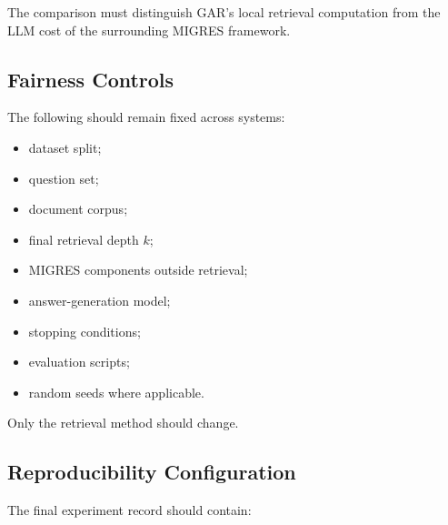 \documentclass[11pt,a4paper]{article}
\begin{document}
The comparison must distinguish GAR's local retrieval computation from the LLM cost of the surrounding MIGRES framework.

\subsection{Fairness Controls}

The following should remain fixed across systems:

\begin{itemize}[leftmargin=1.5em]
\item dataset split;
\item question set;
\item document corpus;
\item final retrieval depth $k$;
\item MIGRES components outside retrieval;
\item answer-generation model;
\item stopping conditions;
\item evaluation scripts;
\item random seeds where applicable.
\end{itemize}

Only the retrieval method should change.

\subsection{Reproducibility Configuration}

The final experiment record should contain:
\end{document}
